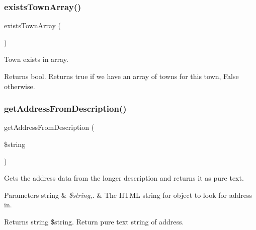 \subsubsection{\texorpdfstring{exists\+Town\+Array()}{existsTownArray()}}
{\footnotesize\ttfamily exists\+Town\+Array (\begin{DoxyParamCaption}{ }\end{DoxyParamCaption})\hspace{0.3cm}{\ttfamily [protected]}}



Town exists in array. 

\begin{DoxyReturn}{Returns}
bool. Returns true if we have an array of towns for this town, False otherwise. 
\end{DoxyReturn}
\hypertarget{veganistan_8php_af1239b1ab4bb8b28bde609484b92de75}{}\label{veganistan_8php_af1239b1ab4bb8b28bde609484b92de75} 
\subsubsection{\texorpdfstring{get\+Address\+From\+Description()}{getAddressFromDescription()}}
{\footnotesize\ttfamily get\+Address\+From\+Description (\begin{DoxyParamCaption}\item[{}]{\$string }\end{DoxyParamCaption})}



Gets the address data from the longer description and returns it as pure text. 


\begin{DoxyParams}[1]{Parameters}
string & {\em \$string,.} & The H\+T\+ML string for object to look for address in.\\
\hline
\end{DoxyParams}
\begin{DoxyReturn}{Returns}
string \$string. Return pure text string of address. 
\end{DoxyReturn}
\hypertarget{veganistan_8php_ab53c3963282815bfc5db50f03053c497}{}\label{veganistan_8php_ab53c3963282815bfc5db50f03053c497} 
